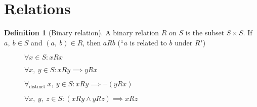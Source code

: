 \documentclass{article}
\theoremstyle{plain}
\numberwithin{theorem}{section}
\theoremstyle{definition}
\newtheorem{definition}{Definition}[section]
\numberwithin{definition}{section}
\begin{document}
\section{Relations}
\begin{definition}[Binary relation]
	A binary relation $R$ on $S$ is the subset $S\times S$.
	If $a, \: b \in S$ and  $(a, \: b) \in R$,
	then $aRb$ (``$a$ is related to $b$ under $R$")
\end{definition}
%
\begin{figure}[H]
\begin{mdframed}[style=exampledefault,frametitle={Relation properties}]
\begin{description}[style=sameline]
	\item[Reflexive:]
		$\forall x \in S : xRx$
	\item[Symmetric:]
		$\forall x,\: y \in S : xRy \implies yRx$
	\item[Antisymmetric:]
		$\forall_\text{distinct} \: x,\: y \in S : xRy \implies \neg (yRx)$
	\item[Transitive:]
		$\forall x,\: y, \: z \in S : (xRy \land yRz) \implies xRz$
\end{description}
\end{mdframed}
\end{figure}
%
\end{document}
